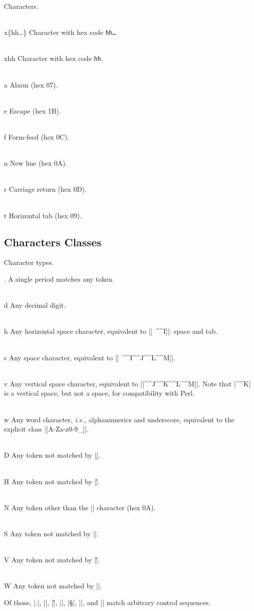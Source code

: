 \documentclass[oneside]{book}
\begin{document}
Characters.
\begin{l3regex-syntax}
  \item[\\x\{hh\ldots{}\}] Character with hex code \texttt{hh\ldots{}}
  \item[\\xhh] Character with hex code \texttt{hh}.
  \item[\\a] Alarm (hex 07).
  \item[\\e] Escape (hex 1B).
  \item[\\f] Form-feed (hex 0C).
  \item[\\n] New line (hex 0A).
  \item[\\r] Carriage return (hex 0D).
  \item[\\t] Horizontal tab (hex 09).
\end{l3regex-syntax}

\subsection{Characters Classes}

Character types.
\begin{l3regex-syntax}
  \item[.] A single period matches any token.
  \item[\\d] Any decimal digit.
  \item[\\h] Any horizontal space character,
    equivalent to |[\ \^^I]|: space and tab.
  \item[\\s] Any space character,
    equivalent to |[\ \^^I\^^J\^^L\^^M]|.
  \item[\\v] Any vertical space character,
    equivalent to |[\^^J\^^K\^^L\^^M]|. Note that |\^^K| is a vertical space,
    but not a space, for compatibility with Perl.
  \item[\\w] Any word character, \emph{i.e.},
    alphanumerics and underscore, equivalent to the explicit
    class |[A-Za-z0-9\_]|.
  \item[\\D] Any token not matched by |\d|.
  \item[\\H] Any token not matched by |\h|.
  \item[\\N] Any token other than the |\n| character (hex 0A).
  \item[\\S] Any token not matched by |\s|.
  \item[\\V] Any token not matched by |\v|.
  \item[\\W] Any token not matched by |\w|.
\end{l3regex-syntax}
Of those, |.|, |\D|, |\H|, |\N|, |\S|, |\V|, and |\W| match arbitrary
control sequences.
\end{document}
